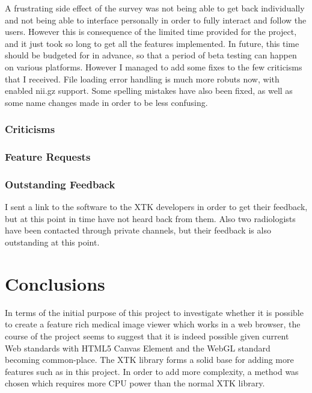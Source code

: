 \documentclass[a4paper,11pt,titlepage]{article}
\begin{document}
A frustrating side effect of the survey
was not being able to get back individually and not being able to interface personally in order to fully interact and follow the users. However this is consequence of the limited time provided for the project, and it just took so long to get all the features implemented. In future, this time should be budgeted for in advance, so that a period of beta testing can happen on various platforms.
However I managed to add some fixes to the few criticisms that I received. File loading error handling is much more robuts now, with enabled nii.gz support. Some spelling mistakes have also been fixed, as well as some name changes made in order to be less confusing.

\subsubsection{Criticisms}


\subsubsection{Feature Requests}


\subsubsection{Outstanding Feedback}

I sent a link to the software to the XTK developers in order to get their feedback, but at this point in time have not heard back from them. Also two radiologists have been contacted through private channels, but their feedback is also outstanding at this point.





\section{Conclusions}

In terms of the initial purpose of this project to investigate whether it is possible to create a feature rich medical image viewer which works in a web browser, the course of the project seems to suggest that it is indeed possible given current Web standards with HTML5 Canvas Element and the WebGL standard becoming common-place. The XTK library forms a solid base for adding more features such as in this project. In order to add more complexity, a method was chosen which requires more CPU power than the normal XTK library.
\end{document}
